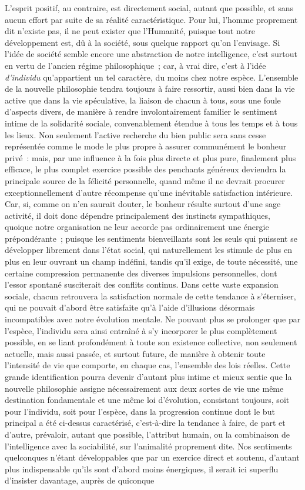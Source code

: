 \documentclass[french,twoside]{book} %
\begin{document}
L’esprit positif, au contraire, est directement social, autant que possible, et sans aucun effort par suite de sa réalité caractéristique. Pour lui, l’homme proprement dit n’existe pas, il ne peut exister que l’Humanité, puisque tout notre développement est, dû à la société, sous quelque rapport qu’on l’envisage. Si l’idée de société semble encore une abstraction de notre intelligence, c’est surtout en vertu de l’ancien régime philosophique ; car, à vrai dire, c’est à l’idée {\itshape d’individu} qu’appartient un tel caractère, du moins chez notre espèce. L’ensemble de la nouvelle philosophie tendra toujours à faire ressortir, aussi bien dans la vie active que dans la vie spéculative, la liaison de chacun à tous, sous une foule d’aspects divers, de manière à rendre involontairement familier le sentiment intime de la solidarité sociale, convenablement étendue à tous les temps et à tous les lieux. Non seulement l’active recherche du bien public sera sans cesse représentée comme le mode le plus propre à assurer communément le bonheur privé : mais, par une influence à la fois plus directe et plus pure, finalement plus efficace, le plus complet exercice possible des penchants généreux deviendra la principale source de la félicité personnelle, quand même il ne devrait procurer exceptionnellement d’autre récompense qu’une inévitable satisfaction intérieure. Car, si, comme on n’en saurait douter, le bonheur résulte surtout d’une sage activité, il doit donc dépendre principalement des instincts sympathiques, quoique notre organisation ne leur accorde pas ordinairement une énergie prépondérante ; puisque les sentiments bienveillants sont les seuls qui puissent se développer librement dans l’état social, qui naturellement les stimule de plus en plus en leur ouvrant un champ indéfini, tandis qu’il exige, de toute nécessité, une certaine compression permanente des diverses impulsions personnelles, dont l’essor spontané susciterait des conflits continus. Dans cette vaste expansion sociale, chacun retrouvera la satisfaction normale de cette tendance à s’éterniser, qui ne pouvait d’abord être satisfaite qu’à l’aide d’illusions désormais incompatibles avec notre évolution mentale. Ne pouvant plus se prolonger que par l’espèce, l’individu sera ainsi entraîné à s’y incorporer le plus complètement possible, en se liant profondément à toute son existence collective, non seulement actuelle, mais aussi passée, et surtout future, de manière à obtenir toute l’intensité de vie que comporte, en chaque cas, l’ensemble des lois réelles. Cette grande identification pourra devenir d’autant plus intime et mieux sentie que la nouvelle philosophie assigne nécessairement aux deux sortes de vie une même destination fondamentale et une même loi d’évolution, consistant toujours, soit pour l’individu, soit pour l’espèce, dans la progression continue dont le but principal a été ci-dessus caractérisé, c’est-à-dire la tendance à faire, de part et d’autre, prévaloir, autant que possible, l’attribut humain, ou la combinaison de l’intelligence avec la sociabilité, sur l’animalité proprement dite. Nos sentiments quelconques n’étant développables que par un exercice direct et soutenu, d’autant plus indispensable qu’ils sont d’abord moins énergiques, il serait ici superflu d’insister davantage, auprès de quiconque 
\end{document}

